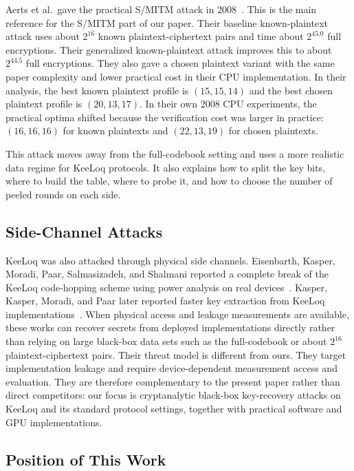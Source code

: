 \documentclass[version=preprint]{iacrcc}
\begin{document}
Aerts et al.\ gave the practical S/MITM attack in 2008~\cite{indesteege2008practical}.
This is the main reference for the S/MITM part of our paper.
Their baseline known-plaintext attack uses about $2^{16}$ known plaintext-ciphertext pairs and time about $2^{45.0}$ full encryptions.
Their generalized known-plaintext attack improves this to about $2^{44.5}$ full encryptions.
They also gave a chosen plaintext variant with the same paper complexity and lower practical cost in their CPU implementation.
In their analysis, the best known plaintext profile is $(15,15,14)$ and the best chosen plaintext profile is $(20,13,17)$.
In their own 2008 CPU experiments, the practical optima shifted because the verification cost was larger in practice: $(16,16,16)$ for known plaintexts and $(22,13,19)$ for chosen plaintexts.

This attack moves away from the full-codebook setting and uses a more realistic data regime for KeeLoq protocols.
It also explains how to split the key bits, where to build the table, where to probe it, and how to choose the number of peeled rounds on each side.

\subsection{Side-Channel Attacks}

KeeLoq was also attacked through physical side channels.
Eisenbarth, Kasper, Moradi, Paar, Salmasizadeh, and Shalmani reported a complete break of the KeeLoq code-hopping scheme using power analysis on real devices~\cite{eisenbarth2008power}.
Kasper, Kasper, Moradi, and Paar later reported faster key extraction from KeeLoq implementations~\cite{kasper2009flash}.
When physical access and leakage measurements are available, these works can recover secrets from deployed implementations directly rather than relying on large black-box data sets such as the full-codebook or about $2^{16}$ plaintext-ciphertext pairs.
Their threat model is different from ours.
They target implementation leakage and require device-dependent measurement access and evaluation.
They are therefore complementary to the present paper rather than direct competitors: our focus is cryptanalytic black-box key-recovery attacks on KeeLoq and its standard protocol settings, together with practical software and GPU implementations.

\subsection{Position of This Work}
\end{document}

